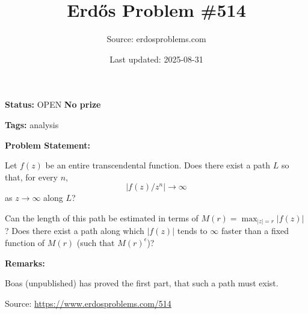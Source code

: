 \documentclass{article}
\title{Erd\H{o}s Problem \#514}
\date{Last updated: 2025-08-31}
\author{Source: erdosproblems.com}
\begin{document}
\maketitle

\noindent\textbf{Status:} OPEN \quad \textbf{No prize}

\noindent\textbf{Tags:} analysis

\medskip
\noindent\textbf{Problem Statement:}

Let $f(z)$ be an entire transcendental function. Does there exist a path $L$ so that, for every $n$,\[\lvert f(z)/z^n\rvert \to \infty\]as $z\to \infty$ along $L$?

Can the length of this path be estimated in terms of $M(r)=\max_{\lvert z\rvert=r}\lvert f(z)\rvert$? Does there exist a path along which $\lvert f(z)\rvert$ tends to $\infty$ faster than a fixed function of $M(r)$ (such that $M(r)^\epsilon$)?

\bigskip
\noindent\textbf{Remarks:}

Boas (unpublished) has proved the first part, that such a path must exist.

\bigskip
\noindent\small{Source: \url{https://www.erdosproblems.com/514}}
\end{document}
